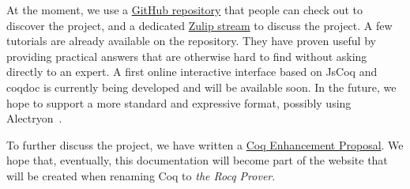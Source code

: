 \documentclass{easychair}
\begin{document}
At the moment, we use a \href{https://github.com/Zimmi48/platform-docs}{GitHub repository}
that people can check out to discover the project, and a dedicated
\href{https://coq.zulipchat.com/#narrow/stream/437203-Platform-docs}{Zulip stream}
to discuss the project.
A few tutorials are already available on the repository.
They have proven useful by providing practical answers that are
otherwise hard to find without asking directly to an expert.
A first online interactive interface based on JsCoq and coqdoc is currently
being developed and will be available soon.
In the future, we hope to support a more standard and expressive format,
possibly using Alectryon~\cite{pit2020untangling}.

To further discuss the project, we have written a \href{https://github.com/coq/ceps/pull/91}{Coq Enhancement Proposal}.
We hope that, eventually, this documentation will become part of the website that will be created when renaming Coq to \emph{the Rocq Prover}.

\label{sect:bib}


\end{document}
